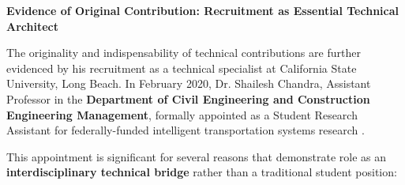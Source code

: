 
\textbf{Evidence of Original Contribution: Recruitment as Essential Technical Architect}

The originality and indispensability of \drs technical contributions are further evidenced by his recruitment as a technical specialist at California State University, Long Beach. In February 2020, Dr. Shailesh Chandra, Assistant Professor in the \textbf{Department of Civil Engineering and Construction Engineering Management}, formally appointed \dr as a Student Research Assistant for federally-funded intelligent transportation systems research \cite{OR1B}.

This appointment is significant for several reasons that demonstrate \drs role as an \textbf{interdisciplinary technical bridge} rather than a traditional student position:

